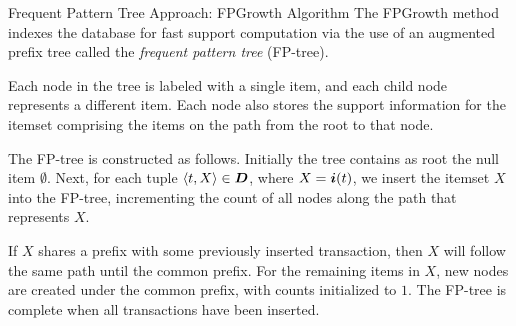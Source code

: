 \ifdefined\wox \begin{frame} \titlepage \end{frame} \fi


\begin{frame}{Frequent Pattern Tree Approach: FPGrowth Algorithm}
The FPGrowth method indexes the database for fast support
computation via the use of an augmented pref\/{i}x tree called the
{\em frequent pattern tree} (FP-tree).  

\medskip
Each
node in the tree is labeled with a single item, and each child node
represents a different item. Each node also stores the support
information for the itemset comprising the items on the path from the
root to that node. 

\medskip
The FP-tree is constructed as follows.
Initially the tree contains as root the null item
$\emptyset$. Next, for each tuple
$\langle t, X \rangle \in {\boldsymbol D}$, where $X={{\boldsymbol i}}(t)$,
we insert the itemset $X$ into the FP-tree,
incrementing the count of all nodes
along the path that represents $X$.

\medskip
If $X$ shares a pref\/{i}x with some previously inserted
transaction, then $X$ will follow the same path until the common
pref\/{i}x. For the remaining items in $X$, new nodes are created
under the common pref\/{i}x, with counts initialized to $1$. The
FP-tree is complete when all transactions have been inserted.
\end{frame}



